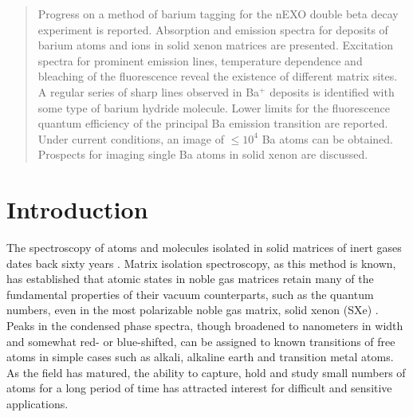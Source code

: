 \documentclass[aps,pra,reprint,superscriptaddress]{revtex4-1}
\begin{document}
\date{\today}

\begin{abstract}
Progress on a method of barium tagging for the nEXO double beta decay experiment is reported.  
Absorption and emission spectra for deposits of barium atoms and ions in solid xenon matrices are presented.
Excitation spectra for prominent emission lines, temperature dependence and bleaching of the fluorescence reveal the existence of different matrix sites.  
A regular series of sharp lines observed in Ba$^+$ deposits is identified with some type of barium hydride molecule.  
Lower limits for the fluorescence quantum efficiency of the principal Ba emission transition are reported.
Under current conditions, an image of $\le10^4$ Ba atoms can be obtained.
Prospects for imaging single Ba atoms in solid xenon are discussed.

\end{abstract}


\maketitle %


\section{Introduction}

The spectroscopy of atoms and molecules isolated in solid matrices of inert gases dates back sixty years \cite{Whittle1954}.
Matrix isolation spectroscopy, as this method is known, has established that atomic states in noble gas matrices retain many of the fundamental properties of their vacuum counterparts, such as the quantum numbers, even in the most polarizable noble gas matrix, solid xenon (SXe) \cite{Crepin1999}.
Peaks in the condensed phase spectra, though broadened to nanometers in width and somewhat red- or blue-shifted, can be assigned to known transitions of free atoms in simple cases such as alkali, alkaline earth and transition metal atoms.
As the field has matured, the ability to capture, hold and study small numbers of atoms for a long period of time has attracted interest for difficult and sensitive applications.
\end{document}
